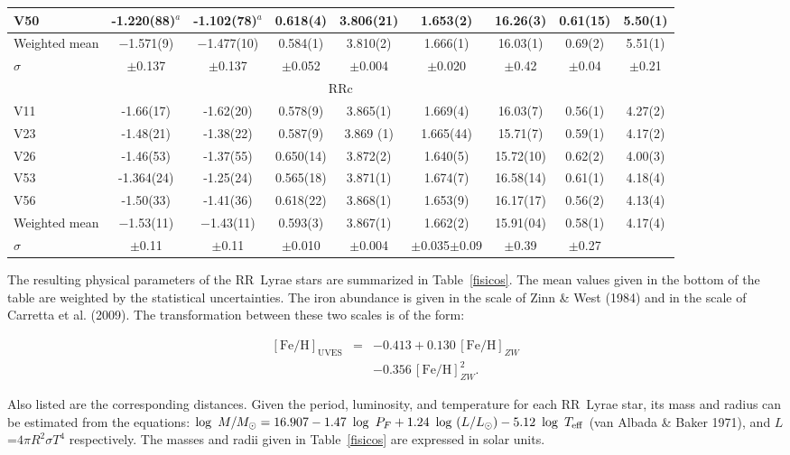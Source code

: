 \documentclass[journal]{rmaa}
\newcommand{\1}{\'{\i}}
\begin{document}
\begin{table*}
\begin{center}
\begin{tabular}{lcccccccc}
V50&-1.220(88)$^{a}$& -1.102(78)$^{a}$&  0.618(4)&  3.806(21)&  1.653(2)& 16.26(3)& 0.61(15)&
5.50(1)\\
\hline
Weighted mean& $-$1.571(9)&$-$1.477(10)& 0.584(1)& 3.810(2)& 1.666(1)& 16.03(1)&
0.69(2)& 5.51(1)\\
$\sigma$&$\pm$0.137&$\pm$0.137&$\pm$0.052&$\pm$0.004&$\pm$0.020&$\pm$0.42&$\pm$0.04&
$\pm$0.21\\
\hline
\multicolumn{9}{c}{RRc} \\
\hline
V11&-1.66(17)&-1.62(20)&0.578(9)&3.865(1)&1.669(4)& 16.03(7)& 0.56(1)& 4.27(2)\\
V23&-1.48(21)&-1.38(22)&0.587(9)&3.869 (1)&1.665(44)& 15.71(7)& 0.59(1)& 4.17(2)\\
V26&-1.46(53)&-1.37(55)&0.650(14)&3.872(2)&1.640(5)& 15.72(10)& 0.62(2)& 4.00(3)\\
V53&-1.364(24)&-1.25(24)&0.565(18)&3.871(1)&1.674(7)& 16.58(14)& 0.61(1)& 4.18(4)\\
V56&-1.50(33)&-1.41(36)&0.618(22)&3.868(1)&1.653(9)& 16.17(17) &0.56(2)& 4.13(4)\\
\hline
Weighted mean&
$-$1.53(11)&$-$1.43(11)&0.593(3)&3.867(1)&1.662(2)&15.91(04)&0.58(1)&4.17(4)\\
$\sigma$&$\pm$0.11&$\pm$0.11&$\pm$0.010&$\pm$0.004&$\pm$0.035$\pm$0.09&$\pm$0.39&$\pm$0.27\\
\hline
\end{tabular}
\end{center}
\raggedright
{}
\end{table*}


The resulting physical parameters of the RR~Lyrae stars are
summarized in Table~\ref{fisicos}. The mean values given in the bottom of the table
are weighted by the statistical uncertainties. The iron abundance is given in the
scale of Zinn \& West (1984) and in the scale of Carretta et al. (2009). The
transformation between these two scales is of the form:

\begin{eqnarray}\label{UVES}
[\mathrm{Fe/H}]_{\mathrm{UVES}} &=& -0.413 +0.130\, [\mathrm{Fe/H}]_{ZW} \nonumber \\
  && -0.356\, [\mathrm{Fe/H}]_{ZW}^2.
\end{eqnarray}

Also listed are the corresponding distances.
Given the period, luminosity, and temperature for each RR~Lyrae star, its
mass and radius can be estimated from the equations: $\log~M/M_{\odot} =
16.907 - 1.47~ \log~P_F + 1.24~\log~(L/L_{\odot}) - 5.12~\log~T_{\rm eff}$ (van Albada
\& Baker 1971), and $L$=$4\pi R^2 \sigma T^4$ respectively.
The masses and radii given in Table~\ref{fisicos} are expressed in solar
units.
\end{document}
